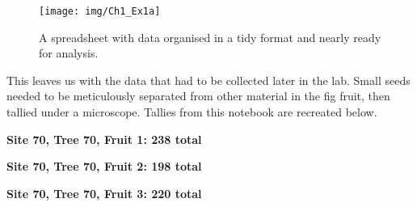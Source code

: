 \documentclass[
  openany]{krantz}
\begin{document}
\begin{figure}
\texttt{[image: img/Ch1\_Ex1a]} \caption{A spreadsheet with data organised in a tidy format and nearly ready for analysis.}\label{fig:unnamed-chunk-11}
\end{figure}

This leaves us with the data that had to be collected later in the lab.
Small seeds needed to be meticulously separated from other material in the fig fruit, then tallied under a microscope. Tallies from this notebook are recreated below.

\textbf{Site 70, Tree 70, Fruit 1: 238 total}

\StrokeFive\StrokeFive\StrokeFive\StrokeFive\StrokeFive\StrokeFive\StrokeFive\StrokeFive\StrokeFive\StrokeFive\StrokeFive\StrokeFive\StrokeFive\StrokeFive\StrokeFive\StrokeFive\StrokeFive\StrokeFive\StrokeFive\StrokeFive

\StrokeFive\StrokeFive\StrokeFive\StrokeFive\StrokeFive\StrokeFive\StrokeFive\StrokeFive\StrokeFive\StrokeFive\StrokeFive\StrokeFive\StrokeFive\StrokeFive\StrokeFive\StrokeFive\StrokeFive\StrokeFive\StrokeFive\StrokeFive

\StrokeFive\StrokeFive\StrokeFive\StrokeFive\StrokeFive\StrokeFive\StrokeFive\StrokeThree

\textbf{Site 70, Tree 70, Fruit 2: 198 total}

\StrokeFive\StrokeFive\StrokeFive\StrokeFive\StrokeFive\StrokeFive\StrokeFive\StrokeFive\StrokeFive\StrokeFive\StrokeFive\StrokeFive\StrokeFive\StrokeFive\StrokeFive\StrokeFive\StrokeFive\StrokeFive\StrokeFive\StrokeFive

\StrokeFive\StrokeFive\StrokeFive\StrokeFive\StrokeFive\StrokeFive\StrokeFive\StrokeFive\StrokeFive\StrokeFive\StrokeFive\StrokeFive\StrokeFive\StrokeFive\StrokeFive\StrokeFive\StrokeFive\StrokeFive\StrokeFive\StrokeThree

\textbf{Site 70, Tree 70, Fruit 3: 220 total}

\StrokeFive\StrokeFive\StrokeFive\StrokeFive\StrokeFive\StrokeFive\StrokeFive\StrokeFive\StrokeFive\StrokeFive\StrokeFive\StrokeFive\StrokeFive\StrokeFive\StrokeFive\StrokeFive\StrokeFive\StrokeFive\StrokeFive\StrokeFive

\StrokeFive\StrokeFive\StrokeFive\StrokeFive\StrokeFive\StrokeFive\StrokeFive\StrokeFive\StrokeFive\StrokeFive\StrokeFive\StrokeFive\StrokeFive\StrokeFive\StrokeFive\StrokeFive\StrokeFive\StrokeFive\StrokeFive\StrokeFive

\StrokeFive\StrokeFive\StrokeFive\StrokeFive
\end{document}

